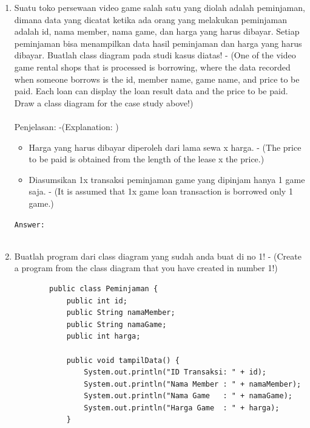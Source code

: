 \documentclass[12pt,titlepage]{article}
\begin{document}
\begin{enumerate}
    \item Suatu toko persewaan video game salah satu yang diolah adalah peminjaman, dimana data yang dicatat ketika ada orang yang melakukan peminjaman adalah id, nama member, nama game, dan harga yang harus dibayar. Setiap peminjaman bisa menampilkan data hasil peminjaman dan harga yang harus dibayar. Buatlah class diagram pada studi kasus diatas! - (One of the video game rental shops that is processed is borrowing, where the data recorded when someone borrows is the id, member name, game name, and price to be paid. Each loan can display the loan result data and the price to be paid. Draw a class diagram for the case study above!) \\\\
    Penjelasan: -(Explanation: )
    \begin{itemize}
        \item Harga yang harus dibayar diperoleh dari lama sewa x harga. - (The price to be paid is obtained from the length of the lease x the price.)
        \item Diasumsikan 1x transaksi peminjaman game yang dipinjam hanya 1 game saja. - (It is assumed that 1x game loan transaction is borrowed only 1 game.)
    \end{itemize}
    \texttt{Answer: }\\\\
    \item Buatlah program dari class diagram yang sudah anda buat di no 1! - (Create a program from the class diagram that you have created in number 1!)
    \begin{verbatim}
        public class Peminjaman {
            public int id;
            public String namaMember;
            public String namaGame;
            public int harga;

            public void tampilData() {
                System.out.println("ID Transaksi: " + id);
                System.out.println("Nama Member : " + namaMember);
                System.out.println("Nama Game   : " + namaGame);
                System.out.println("Harga Game  : " + harga);
            }


\end{verbatim}
\end{enumerate}
\end{document}
